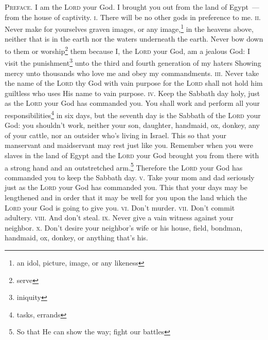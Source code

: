 
\begin{enumerate*}[mode=unboxed]
     \textsc{Preface.} I am the \textsc{Lord} your God. I brought you out from the land of Egypt~--- from the house of captivity.%
     \textsc{i.} There will be no other gods in preference to me.%
     \textsc{ii.} Never make for yourselves graven images, or any image,\footnote{an idol, picture, image, or any likeness} in the heavens above, neither that is in the earth nor the waters underneath the earth.%
     Never bow down to them or worship\footnote{serve} them because I, the \textsc{Lord} your God, am a jealous God: I visit the punishment\footnote{iniquity} unto the third and fourth generation of my haters%
     Showing mercy unto thousands who love me and obey my commandments.%
     \textsc{iii.} Never take the name of the \textsc{Lord} thy God with vain purpose for the \textsc{Lord} shall not hold him guiltless who uses His name to vain purpose.%
     \textsc{iv.} Keep the Sabbath day holy, just as the \textsc{Lord} your God has commanded you.%
     You shall work and perform all your responsibilities\footnote{tasks, errands} in six days,%
     but the seventh day is the Sabbath of the \textsc{Lord} your God: you shouldn't work, neither your son, daughter, handmaid, ox, donkey, any of your cattle, nor an outsider who's living in Israel. This so that your manservant and maidservant may rest just like you.%
     Remember when you were slaves in the land of Egypt and the \textsc{Lord} your God brought you from there with a strong hand and an outstretched arm.\footnote{So that He can show the way; fight our battles} Therefore the \textsc{Lord} your God has commanded you to keep the Sabbath day.%
     \textsc{v.} Take your mom and dad seriously just as the \textsc{Lord} your God has commanded you. This that your days may be lengthened and in order that it may be well for you upon the land which the \textsc{Lord} your God is going to give you.%
     \textsc{vi.} Don't murder.%
     \textsc{vii.} Don't commit adultery.%
     \textsc{viii.} And don't steal.%
     \textsc{ix.} Never give a vain witness against your neighbor.%
     \textsc{x.} Don't desire your neighbor's wife or his house, field, bondman, handmaid, ox, donkey, or anything that's his.%
\end{enumerate*}
